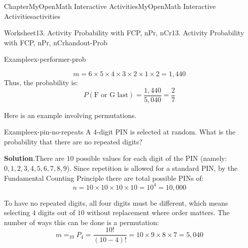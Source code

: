 \documentclass[oneside,10pt,]{book}
\newcommand{\blocktitlefont}{\relax}
\newcommand{\ptxlistdisc}{\raisebox{0.3ex}{\textbullet}}
\newlength{\fillinmaxwidth}
\newlength{\fillincontract}
\newlength{\charmaxwidth}\setlength{\charmaxwidth}{0.5em}
\newlength{\charminwidth}\setlength{\charminwidth}{0.1em}
\newlength{\fillinheight}
\newcommand{\fillintext}[1]{%
\setlength{\fillinmaxwidth}{#1\charmaxwidth}%
\setlength{\fillincontract}{#1\charminwidth}%
\setlength{\fillinheight}{\baselineskip}\addtolength{\fillinheight}{1.2pt}%
\strut\nobreak\leaders\vbox{\hrule width 0.3pt height 0.3pt \vskip -1.2pt}\hskip 1\fillinmaxwidth minus \fillincontract\nobreak\strut%
}
\begin{document}
\begin{chapterptx}{Chapter}{MyOpenMath Interactive Activities}{}{MyOpenMath Interactive Activities}{}{}{activities}
\begin{worksheet-section}{Worksheet}{13. Activity Probability with FCP, nPr, nCr}{}{13. Activity Probability with FCP, nPr, nCr}{}{}{handout-Prob}
\begin{example}{Example}{}{ex-performer-prob}
\begin{enumerate}[label={\alph*}]
\begin{equation*}
m = 6 \times 5 \times 4 \times 3 \times 2 \times 1 \times 2 = 1,440
\end{equation*}
Thus, the probability is:%
\begin{equation*}
P(\text{F or G last}) = \frac{1,440}{5,040} = \frac{2}{7}
\end{equation*}
%
\end{enumerate}
%
\end{example}
%
\clearpage
Here is an example involving permutations.%
\begin{example}{Example}{}{ex-pin-no-repeats}%
A 4-digit PIN is selected at random. What is the probability that there are no repeated digits?%
\par\smallskip%
\noindent\textbf{\blocktitlefont Solution}.\hypertarget{ex-pin-no-repeats-2}{}\quad{}There are \(10\) possible values for each digit of the PIN (namely: \(0, 1, 2, 3, 4, 5, 6, 7, 8, 9\)). Since repetition is allowed for a standard PIN, by the Fundamental Counting Principle there are total possible PINs of:%
\begin{equation*}
n = 10 \times 10 \times 10 \times 10 = 10^4 = 10,000
\end{equation*}
%
\par
To have no repeated digits, all four digits must be different, which means selecting \(4\) digits out of \(10\) without replacement where order matters. The number of ways this can be done is a permutation:%
\begin{equation*}
m = _{10}P_{4} = \frac{10!}{(10-4)!} = 10 \times 9 \times 8 \times 7 = 5,040
\end{equation*}
%
\par

\end{example}
\end{worksheet-section}
\end{chapterptx}
\end{document}
